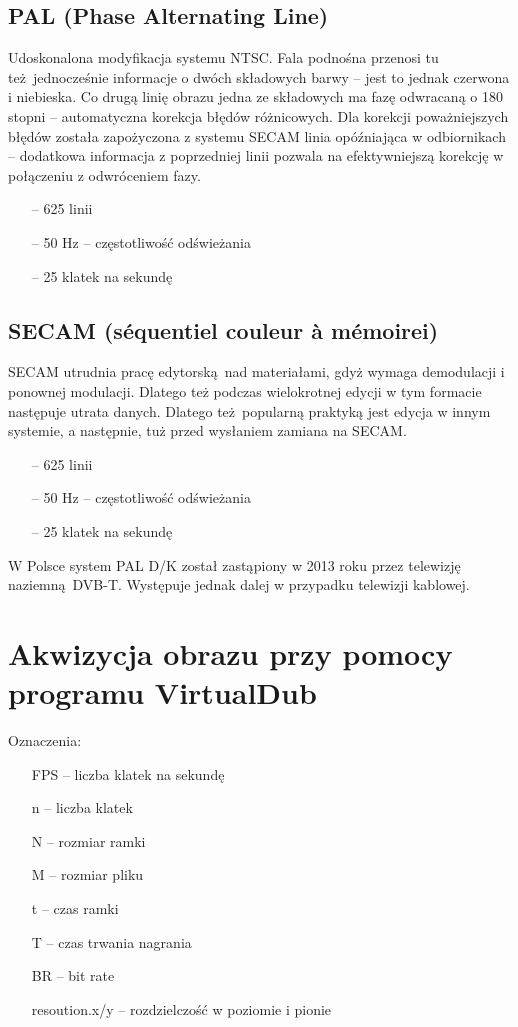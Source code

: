\documentclass[a4paper, 12pt, titlepage]{article}
\begin{document}
        \subsection{PAL (Phase Alternating Line)}
            Udoskonalona modyfikacja systemu NTSC. Fala podnośna przenosi tu 
            też jednocześnie informacje o dwóch składowych barwy -- jest to
            jednak czerwona i niebieska. Co drugą linię obrazu jedna ze
            składowych ma fazę odwracaną o 180 stopni -- automatyczna korekcja
            błędów różnicowych. Dla korekcji poważniejszych błędów została
            zapożyczona z systemu SECAM linia opóźniająca w odbiornikach --
            dodatkowa informacja z poprzedniej linii pozwala na efektywniejszą
            korekcję w połączeniu z odwróceniem fazy.
            \begin{itemize}
                \item[--] 625 linii
                \item[--] 50 Hz -- częstotliwość odświeżania
                \item[--] 25 klatek na sekundę
            \end{itemize}
        \subsection{SECAM (séquentiel couleur à mémoirei)}
            SECAM utrudnia pracę edytorską nad materiałami, gdyż wymaga 
            demodulacji i ponownej modulacji. Dlatego też podczas 
            wielokrotnej edycji w tym formacie następuje utrata danych.
            Dlatego też popularną praktyką jest edycja w innym systemie,
            a następnie, tuż przed wysłaniem zamiana na SECAM.
            \begin{itemize}
                \item[--] 625 linii
                \item[--] 50 Hz -- częstotliwość odświeżania
                \item[--] 25 klatek na sekundę
            \end{itemize}
        W Polsce system PAL D/K został zastąpiony w 2013 roku przez telewizję
        naziemną DVB-T. Występuje jednak dalej w przypadku telewizji kablowej.
    \section{Akwizycja obrazu przy pomocy programu VirtualDub}
        Oznaczenia:
        \begin{itemize}
            \item[] FPS -- liczba klatek na sekundę
            \item[] n -- liczba klatek
            \item[] N -- rozmiar ramki
            \item[] M -- rozmiar pliku
            \item[] t -- czas ramki
            \item[] T -- czas trwania nagrania
            \item[] BR -- bit rate
            \item[] resoution.x/y -- rozdzielczość w poziomie i pionie
        \end{itemize}
\end{document}
